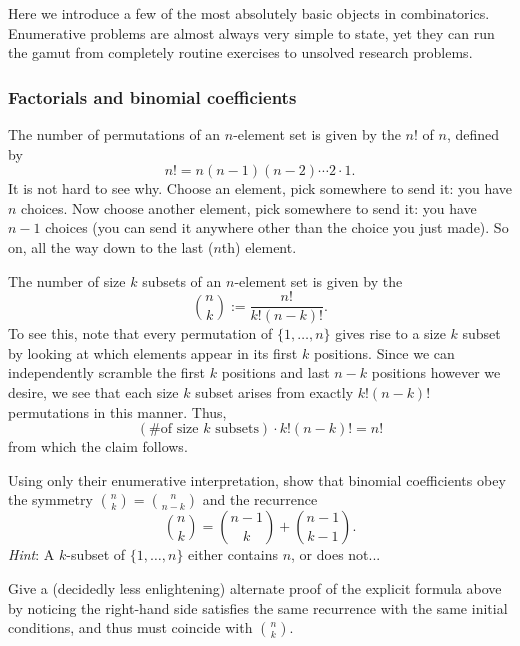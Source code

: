 Here we introduce a few of the most absolutely basic objects in combinatorics. Enumerative problems are almost always very simple to state, yet they can run the gamut from completely routine exercises to unsolved research problems.

\subsubsection*{Factorials and binomial coefficients}

\begin{example}
The number of permutations of an $n$-element set is given by the  $n!$ of $n$, defined by
\[ n! = n(n-1)(n-2) \cdots 2 \cdot 1. \]
It is not hard to see why. Choose an element, pick somewhere to send it: you have $n$ choices. Now choose another element, pick somewhere to send it: you have $n-1$ choices (you can send it anywhere other than the choice you just made). So on, all the way down to the last ($n$th) element.
\end{example}


\begin{example}
The number of size $k$ subsets of an $n$-element set is given by the 
\[ \binom{n}{k} := \frac{n!}{k!(n-k)!}. \]
To see this, note that every permutation of $\{ 1, \ldots, n \}$ gives rise to a size $k$ subset by looking at which elements appear in its first $k$ positions. Since we can independently scramble the first $k$ positions and last $n-k$ positions however we desire, we see that each size $k$ subset arises from exactly $k!(n-k)!$ permutations in this manner. Thus,
\[ (\text{\# of size $k$ subsets}) \cdot k!(n-k)! = n! \]
from which the claim follows.
\end{example}

\begin{exercise}
Using only their enumerative interpretation, show that binomial coefficients obey the symmetry $\binom{n}{k} = \binom{n}{n-k}$ and the recurrence
\[ \binom{n}{k} = \binom{n-1}{k} + \binom{n-1}{k-1}. \]
\emph{Hint}: A $k$-subset of $\{ 1, \ldots, n \}$ either contains $n$, or does not...

Give a (decidedly less enlightening) alternate proof of the explicit formula above by noticing the right-hand side satisfies the same recurrence with the same initial conditions, and thus must coincide with $\binom{n}{k}$.
\end{exercise}


